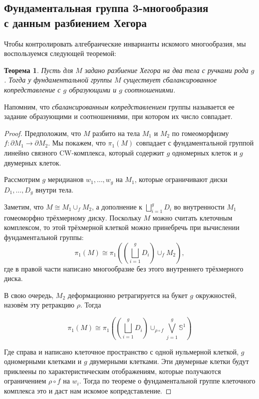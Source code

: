 \documentclass[a4paper, 12pt]{article}
\newtheorem*{theorem}{Теорема}
\theoremstyle{definition}
\begin{document}
    \subsection{Фундаментальная группа 3-многообразия \\ с данным разбиением Хегора}

        Чтобы контролировать алгебраические инварианты искомого многообразия, мы воспользуемся следующей теоремой:

        \begin{theorem} 
            Пусть для $M$ задано разбиение Хегора на два тела с ручками рода $g$. Тогда у фундаментальной группы $M$ существует сбалансированное копредставление с $g$ образующими и $g$ соотношениями.
        \end{theorem}

        Напомним, что \textit{сбалансированным копредставлением} группы называется ее задание образующими и соотношениями, при котором их число совпадает.

        \begin{proof}
            Предположим, что $M$ разбито на тела $M_1$ и $M_2$ по гомеоморфизму $f: \partial M_1 \rightarrow \partial M_2$. Мы покажем, что $\pi_1(M)$ совпадает с фундаментальной группой линейно связного CW-комплекса, который содержит $g$ одномерных клеток и $g$ двумерных клеток.  
            
            Рассмотрим $g$ меридианов $w_1, \dots, w_g$ на $M_1$, которые ограничивают диски $D_1, \dots, D_g$ внутри тела.

            Заметим, что $M \cong M_1 \cup_f M_2$, а дополнение к $\bigsqcup_{i = 1}^{g} D_i$ во внутренности $M_1$ гомеоморфно трёхмерному диску. Поскольку $M$ можно считать клеточным комплексом, то этой трёхмерной клеткой можно принебречь при вычислении фундаментальной группы: 
            \[\pi_1(M) \cong \pi_1 \left( \left(\bigsqcup_{i = 1}^{g} D_i\right) \cup_f M_2 \right),\] 
            где в правой части написано многообразие без этого внутреннего трёхмерного диска.
            
            В свою очередь, $M_2$ деформационно ретрагируется на букет $g$ окружностей, назовём эту ретракцию $\rho$. Тогда


            \[\pi_1(M) \cong \pi_1\left( \left(\bigsqcup_{i = 1}^{g} D_i\right) \cup_{\rho \circ f} \bigvee_{j = 1}^{g} \mathbb{S}^1\right) \]

            Где справа и написано клеточное пространство с одной нульмерной клеткой, $g$ одномерными клетками и $g$ двумерными клетками. Эти двумерные клетки будут приклеены по характеристическим отображениям, которые получаются ограничением $\rho \circ f$ на $w_i$. Тогда по теореме о фундаментальной группе клеточного комплекса это и даст нам искомое копредставление. 
            
        \end{proof}
\end{document}
